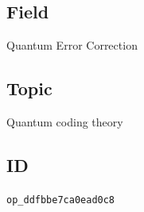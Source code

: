 \subsection*{Field}

Quantum Error Correction

\subsection*{Topic}

Quantum coding theory

\subsection*{ID}

\texttt{op\_ddfbbe7ca0ead0c8}
